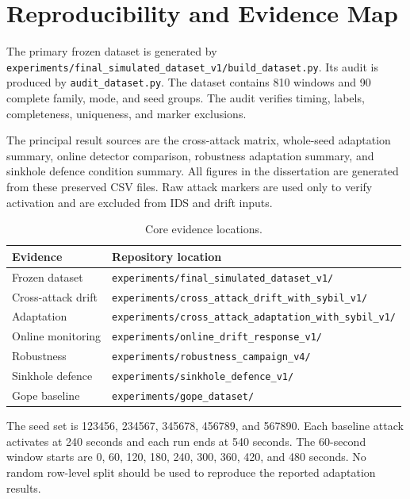 \chapter{Reproducibility and Evidence Map}
\label{app:reproducibility}

The primary frozen dataset is generated by \texttt{experiments/final\_simulated\_dataset\_v1/build\_dataset.py}. Its audit is produced by \texttt{audit\_dataset.py}. The dataset contains 810 windows and 90 complete family, mode, and seed groups. The audit verifies timing, labels, completeness, uniqueness, and marker exclusions.

The principal result sources are the cross-attack matrix, whole-seed adaptation summary, online detector comparison, robustness adaptation summary, and sinkhole defence condition summary. All figures in the dissertation are generated from these preserved CSV files. Raw attack markers are used only to verify activation and are excluded from IDS and drift inputs.

\begin{table}[H]
\centering
\caption{Core evidence locations.}
\label{tab:evidence-map}
\begin{tabularx}{\textwidth}{p{}X}
\toprule
Evidence & Repository location \\
\midrule
Frozen dataset & \texttt{experiments/final\_simulated\_dataset\_v1/} \\
Cross-attack drift & \texttt{experiments/cross\_attack\_drift\_with\_sybil\_v1/} \\
Adaptation & \texttt{experiments/cross\_attack\_adaptation\_with\_sybil\_v1/} \\
Online monitoring & \texttt{experiments/online\_drift\_response\_v1/} \\
Robustness & \texttt{experiments/robustness\_campaign\_v4/} \\
Sinkhole defence & \texttt{experiments/sinkhole\_defence\_v1/} \\
Gope baseline & \texttt{experiments/gope\_dataset/} \\
\bottomrule
\end{tabularx}
\end{table}

The seed set is 123456, 234567, 345678, 456789, and 567890. Each baseline attack activates at 240 seconds and each run ends at 540 seconds. The 60-second window starts are 0, 60, 120, 180, 240, 300, 360, 420, and 480 seconds. No random row-level split should be used to reproduce the reported adaptation results.
